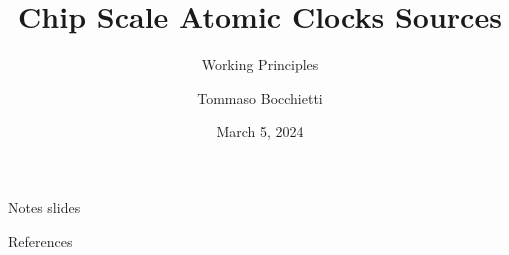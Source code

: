 \documentclass[10pt]{beamer}
\title{Chip Scale Atomic Clocks Sources}
\subtitle{Working Principles}
\date{March 5, 2024}
\author{Tommaso Bocchietti}
\institute{University of Waterloo}
\begin{document}
\maketitle


\appendix

\begin{frame}[standout]
    Notes slides
\end{frame}



\begin{frame}[allowframebreaks]{References}
    
    
\end{frame}
\end{document}
